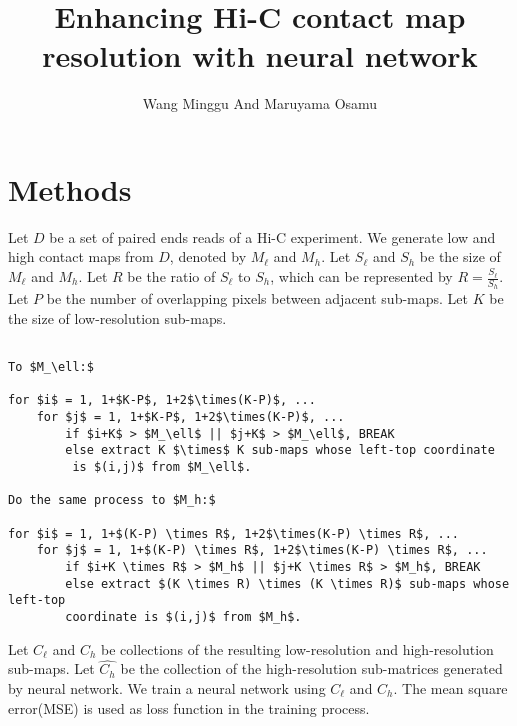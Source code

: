\documentclass{article}
\begin{document}
\title{Enhancing Hi-C contact map resolution with neural network}
\author{Wang Minggu And Maruyama Osamu}
\maketitle



\section{Methods}


Let $D$ be a set of paired ends reads of a Hi-C experiment. 
We generate low and high contact maps from $D$, denoted by $M_\ell$ and $M_h$. 
Let $S_\ell$ and $S_h$ be the size of $M_\ell$ and $M_h$. 
Let $R$ be the ratio of $S_\ell$ to $S_h$, which can be represented by
$R = \frac{S_\ell}{S_h}$. Let $P$ be the number of overlapping pixels between adjacent sub-maps.
Let $K$ be the size of low-resolution sub-maps.

\begin{Verbatim}[commandchars=\\\{\},codes={\catcode`$=3\catcode`_=8\catcode`^=7}]
% Divide matrices $M_\ell$ and $M_h$ \

To $M_\ell:$

for $i$ = 1, 1+$K-P$, 1+2$\times(K-P)$, ...
    for $j$ = 1, 1+$K-P$, 1+2$\times(K-P)$, ...
        if $i+K$ > $M_\ell$ || $j+K$ > $M_\ell$, BREAK 
        else extract K $\times$ K sub-maps whose left-top coordinate
         is $(i,j)$ from $M_\ell$.

Do the same process to $M_h:$

for $i$ = 1, 1+$(K-P) \times R$, 1+2$\times(K-P) \times R$, ...
    for $j$ = 1, 1+$(K-P) \times R$, 1+2$\times(K-P) \times R$, ...
        if $i+K \times R$ > $M_h$ || $j+K \times R$ > $M_h$, BREAK 
        else extract $(K \times R) \times (K \times R)$ sub-maps whose left-top 
        coordinate is $(i,j)$ from $M_h$.
\end{Verbatim}



\noindent Let $C_\ell$ and $C_h$ be collections of the resulting low-resolution and high-resolution
sub-maps. Let $\hat{C_h}$ be the collection of the high-resolution sub-matrices generated by neural network. We train a neural network using $C_\ell$ and $C_h$. The mean square error(MSE) is used as 
loss function in the training process. 
\end{document}
